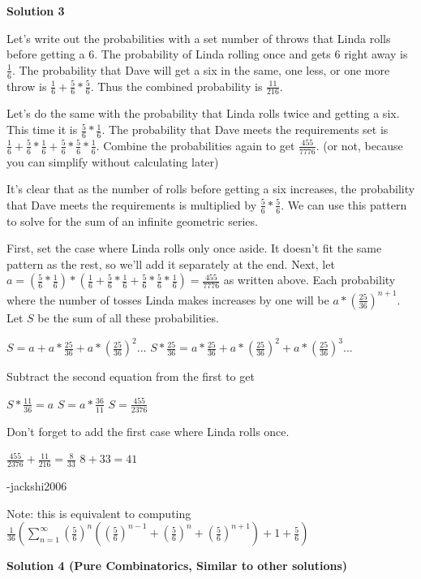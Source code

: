 \begin{enumerate}
\textbf{Solution 3}

Let's write out the probabilities with a set number of throws that Linda rolls before getting a 6. The probability of Linda rolling once and gets 6 right away is $\frac{1}{6}$. The probability that Dave will get a six in the same, one less, or one more throw is $\frac{1}{6} + \frac{5}{6} * \frac{5}{6}$. Thus the combined probability is $\frac{11}{216}$. 

 Let's do the same with the probability that Linda rolls twice and getting a six. This time it is $\frac{5}{6} * \frac{1}{6}$. The probability that Dave meets the requirements set is $\frac{1}{6} + \frac{5}{6} * \frac{1}{6} + \frac{5}{6} * \frac{5}{6} * \frac{1}{6}$. Combine the probabilities again to get $\frac{455}{7776}$. (or not, because you can simplify without calculating later)

 It's clear that as the number of rolls before getting a six increases, the probability that Dave meets the requirements is multiplied by $\frac{5}{6} * \frac{5}{6}$. We can use this pattern to solve for the sum of an infinite geometric series.

 
First, set the case where Linda rolls only once aside. It doesn't fit the same pattern as the rest, so we'll add it separately at the end. Next, let $a = (\frac{5}{6} * \frac{1}{6}) * (\frac{1}{6} + \frac{5}{6} * \frac{1}{6} + \frac{5}{6} * \frac{5}{6} * \frac{1}{6}) = \frac{455}{7776}$ as written above. Each probability where the number of tosses Linda makes increases by one will be $a * (\frac{25}{36})^{n+1}$. Let $S$ be the sum of all these probabilities. 

 $S = a + a * \frac{25}{36} + a * (\frac{25}{36})^2...$
$S * \frac{25}{36} = a * \frac{25}{36} + a * (\frac{25}{36})^2 + a * (\frac{25}{36})^3...$

 Subtract the second equation from the first to get

 $S * \frac{11}{36} = a$
$S = a * \frac{36}{11}$
$S = \frac{455}{2376}$

 Don't forget to add the first case where Linda rolls once.

 $\frac{455}{2376} + \frac{11}{216} = \frac{8}{33}$
$8 + 33 = \boxed{41}$

 -jackshi2006

 Note: this is equivalent to computing $\frac{1}{36}(\sum_{n=1}^{\infty} (\frac{5}{6})^n((\frac{5}{6})^{n-1}+(\frac{5}{6})^{n}+(\frac{5}{6})^{n+1})+1+\frac{5}{6})$




\textbf{Solution 4 (Pure Combinatorics, Similar to other solutions)}


\end{enumerate}
